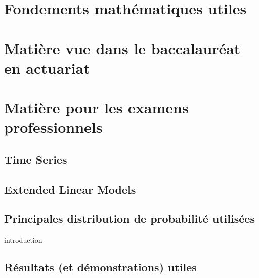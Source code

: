 \documentclass[12pt, french]{book}
\begin{document}


\frontmatter %



{
    \hypersetup{linkcolor=tocColor}
    \bfseries %
    \tableofcontents
}
\newpage

\mainmatter %

\part{Fondements mathématiques utiles}






\part{Matière vue dans le baccalauréat en actuariat}






\part{Matière pour les examens professionnels}

\chapter{Time Series}

\label{sec:Serie-Chronologique}

\chapter{Extended Linear Models}

\label{sec:Extended-Linear-Models}

\appendix
\chapter{Principales distribution de probabilité utilisées}
introduction


\chapter{Résultats (et démonstrations) utiles}

\end{document}
